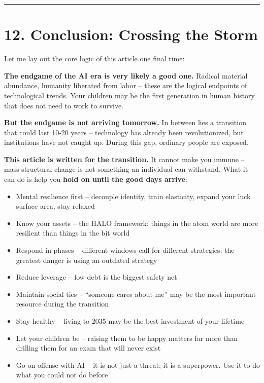 \begin{center}\rule{0.5\linewidth}{0.5pt}\end{center}

\section{12. Conclusion: Crossing the
Storm}\label{conclusion-crossing-the-storm}

Let me lay out the core logic of this article one final time:

\textbf{The endgame of the AI era is very likely a good one.} Radical
material abundance, humanity liberated from labor -- these are the
logical endpoints of technological trends. Your children may be the
first generation in human history that does not need to work to survive.

\textbf{But the endgame is not arriving tomorrow.} In between lies a
transition that could last 10-20 years -- technology has already been
revolutionized, but institutions have not caught up. During this gap,
ordinary people are exposed.

\textbf{This article is written for the transition.} It cannot make you
immune -- mass structural change is not something an individual can
withstand. What it can do is help you \textbf{hold on until the good
days arrive}:

\begin{itemize}
\tightlist
\item
  Mental resilience first -- decouple identity, train elasticity, expand
  your luck surface area, stay relaxed
\item
  Know your assets -- the HALO framework: things in the atom world are
  more resilient than things in the bit world
\item
  Respond in phases -- different windows call for different strategies;
  the greatest danger is using an outdated strategy
\item
  Reduce leverage -- low debt is the biggest safety net
\item
  Maintain social ties -- ``someone cares about me'' may be the most
  important resource during the transition
\item
  Stay healthy -- living to 2035 may be the best investment of your
  lifetime
\item
  Let your children be -- raising them to be happy matters far more than
  drilling them for an exam that will never exist
\item
  Go on offense with AI -- it is not just a threat; it is a superpower.
  Use it to do what you could not do before
\end{itemize}

